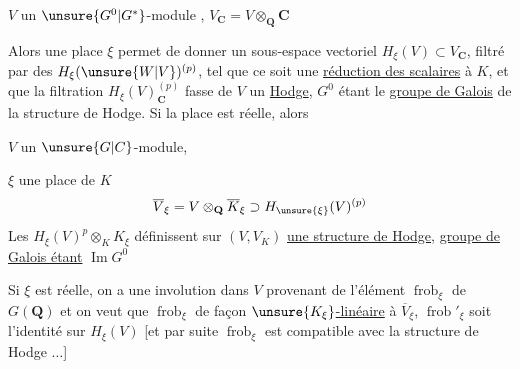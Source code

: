 $V$ un $\unsure{G^0|G^*}$-module , $V_{\mathbf C}=V\otimes_{\mathbf Q}\mathbf C$

Alors une place  $\xi$ permet de donner un sous-espace vectoriel $H_\xi(V)\subset V_{\mathbf C}$, filtré par des $H_\xi(\unsure{W|V})^{(p)}$, tel que  ce soit une \uline{réduction des scalaires} à $K$, et que la filtration $H_\xi(V)_{\mathbf C}^{(p)}$ fasse de $V$ un  \uline{Hodge}, $G^0$ étant   le \uline{groupe de Galois} de la structure de Hodge. Si la place est réelle, alors

 $V$ un $\unsure{G|C}$-module,

$\xi$ une place de $K$
\[
\overline V_\xi=V\otimes_{\mathbf Q}\overline K_\xi\supset H_{\unsure{\xi}}(V)^{(p)}
\]
Les $H_\xi(V)^p\otimes_K K_\xi$ définissent sur $(V,V_K)$ \uline{une structure de Hodge},  \uline{groupe de Galois étant}  \uline{ $\operatorname{Im}G^0$}

Si $\xi$ est réelle, on a une involution dans $V$ provenant de l'élément  $\operatorname{frob}_\xi$ de $G(\mathbf Q)$ et on veut que  $\operatorname{frob}_\xi$ de façon \uline{$\unsure{K_\xi}$-linéaire} à $\overline V_\xi$, $\operatorname{frob}'_\xi$ soit l'identité sur $H_\xi(V)$ [et par suite $\operatorname{frob}_\xi$ est compatible avec la structure de Hodge $\ldots$]
